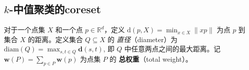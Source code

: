 \documentclass[lang=cn,newtx,10pt,scheme=chinese,chinesefont=nofont,citestyle=gb7714-2015, bibstyle=gb7714-2015]{elegantbook}
\begin{document}
\begin{refsection}









\section[k-中值聚类的 coreset]{$k$-中值聚类的coreset}
对于一个点集 $X$ 和一个点 $p \in \mathbb{R}^d$，定义
$\mathrm{d}(p, X) = \min_{x \in X} \|xp\|$
为点 $p$ 到集合 $X$ 的距离。定义集合 $Q \subseteq X$ 的 \emph{直径}（diameter）为
$\mathrm{diam}(Q) = \max_{s, t \in Q} \mathbf{d}(s, t)$,
即 $Q$ 中任意两点之间的最大距离。记
$\mathbf{w}(P) = \sum_{p \in P} \mathbf{w}(p)$
为点集 $P$ 的 \textbf{总权重}（total weight）。






\end{refsection}
\end{document}
